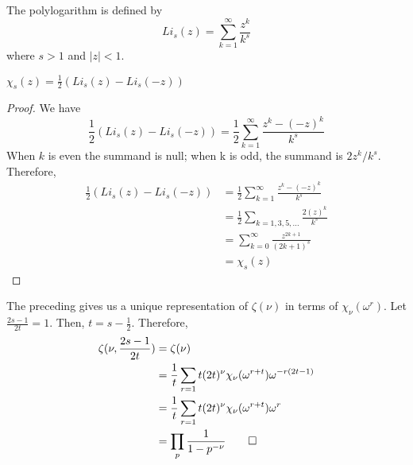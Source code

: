 \documentclass[../article.tex]{subfiles}
\begin{document}
\begin{definition}
The polylogarithm is defined by
\begin{equation}
Li_{s}(z) = \sum_{k=1}^{\infty} \frac{z^k}{k^s}
\end{equation}
where $s > 1$ and $|z| < 1$.
\end{definition}

\begin{theorem}
$\chi_{s}(z) = \frac{1}{2} (Li_{s}(z) - Li_{s}(-z))$
\end{theorem}
\begin{proof}
We have
\begin{equation}
\frac{1}{2} (Li_{s}(z) - Li_{s}(-z)) = \frac{1}{2} \sum_{k=1}^{\infty} \frac{z^{k} - (-z)^k}{k^s}
\end{equation}
When $k$ is even the summand is null; when k is odd, the summand is $2z^{k}/k^s$. Therefore,
\begin{equation}
\begin{split}
\frac{1}{2} (Li_{s}(z) - Li_{s}(-z)) &= \frac{1}{2} \sum_{k=1}^{\infty} \frac{z^{k} - (-z)^k}{k^s} \\
&= \frac{1}{2} \sum_{k=1,3,5,...} \frac{2(z)^k}{k^s} \\
&= \sum_{k=0}^{\infty} \frac{z^{2k+1}}{(2k+1)^s} \\
&= \chi_{s}(z)
\end{split}
\end{equation}
\end{proof}
\begin{corollary}
The preceding gives us a unique representation of $\zeta(\nu)$ in terms of $\chi_{\nu}(\omega^r)$. Let $\frac{2s-1}{2t} = 1$. Then, $t = s - \frac{1}{2}.$ Therefore,
\begin{equation}
\begin{split}
\zeta(\nu, \frac{2s-1}{2t}) &= \zeta(\nu) \\
&= \frac{1}{t} \sum_{r=1}{t} (2t)^{\nu} \chi_{\nu}(\omega^{r+t}) \omega^{-r(2t-1)} \\
&= \frac{1}{t} \sum_{r=1}{t} (2t)^{\nu} \chi_{\nu}(\omega^{r+t}) \omega^{r} \\
&= \prod_{p} \frac{1}{1- p^{-\nu}}\qed
\end{split}
\end{equation}
\end{corollary}
\end{document}

